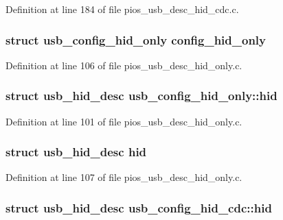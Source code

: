 Definition at line 184 of file pios\-\_\-usb\-\_\-desc\-\_\-hid\-\_\-cdc.\-c.

\hypertarget{group___p_i_o_s___u_s_b___d_e_s_c_ga4729f56193bb7fb5a7c5115995ec85db}{
\subsubsection[{config\-\_\-hid\-\_\-only}]{\setlength{\rightskip}{0pt plus 5cm}struct {\bf usb\-\_\-config\-\_\-hid\-\_\-only} config\-\_\-hid\-\_\-only}}\label{group___p_i_o_s___u_s_b___d_e_s_c_ga4729f56193bb7fb5a7c5115995ec85db}


Definition at line 106 of file pios\-\_\-usb\-\_\-desc\-\_\-hid\-\_\-only.\-c.

\hypertarget{group___p_i_o_s___u_s_b___d_e_s_c_ga279cdc579474d229bf1bb7963f423423}{
\subsubsection[{hid}]{\setlength{\rightskip}{0pt plus 5cm}struct {\bf usb\-\_\-hid\-\_\-desc} usb\-\_\-config\-\_\-hid\-\_\-only\-::hid}}\label{group___p_i_o_s___u_s_b___d_e_s_c_ga279cdc579474d229bf1bb7963f423423}


Definition at line 101 of file pios\-\_\-usb\-\_\-desc\-\_\-hid\-\_\-only.\-c.

\hypertarget{group___p_i_o_s___u_s_b___d_e_s_c_ga6eb333cd7c6d156f25fa827aa085579c}{
\subsubsection[{hid}]{\setlength{\rightskip}{0pt plus 5cm}struct {\bf usb\-\_\-hid\-\_\-desc} hid}}\label{group___p_i_o_s___u_s_b___d_e_s_c_ga6eb333cd7c6d156f25fa827aa085579c}


Definition at line 107 of file pios\-\_\-usb\-\_\-desc\-\_\-hid\-\_\-only.\-c.

\hypertarget{group___p_i_o_s___u_s_b___d_e_s_c_ga8b4c52ed5995d3193869596bc47a4e58}{
\subsubsection[{hid}]{\setlength{\rightskip}{0pt plus 5cm}struct {\bf usb\-\_\-hid\-\_\-desc} usb\-\_\-config\-\_\-hid\-\_\-cdc\-::hid}}\label{group___p_i_o_s___u_s_b___d_e_s_c_ga8b4c52ed5995d3193869596bc47a4e58}


